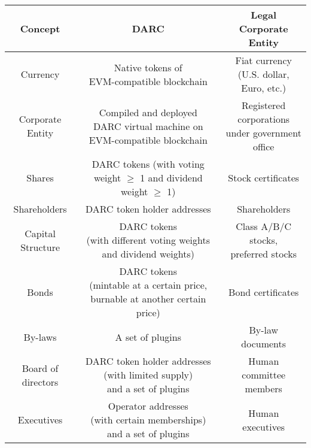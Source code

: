 \documentclass[main.tex]{subfiles}
\begin{document}
\begin{table}[h!]
    \centering
    \begin{tabular}{| c | c | c|} 
        \hline
        Concept & DARC & Legal Corporate Entity \\ [0.5ex] 
        \hline\hline
    
        Currency & \makecell{Native tokens of \\ EVM-compatible blockchain} & \makecell{Fiat currency \\ (U.S. dollar, Euro, etc.)} \\
        \hline
        Corporate Entity & \makecell{Compiled and deployed \\ DARC  virtual machine on \\  EVM-compatible blockchain} & \makecell{Registered corporations \\ under government office} \\
        \hline
        Shares & \makecell{DARC tokens \\ (with voting weight \(\ge\) 1 \\ and dividend weight \(\ge\) 1)} & Stock certificates \\
        \hline
        Shareholders & DARC token holder addresses & Shareholders \\
        \hline
        Capital Structure & \makecell{DARC tokens \\ (with different voting weights \\ and dividend weights)} & \makecell{Class A/B/C stocks, \\ preferred stocks } \\
        \hline
        Bonds & \makecell{DARC tokens \\ (mintable at a certain price, \\ burnable at another certain price)} & Bond certificates \\
        \hline
        By-laws & A set of plugins & By-law documents \\
        \hline 
        Board of directors & \makecell{DARC token holder addresses \\ (with limited supply) \\ and a set of plugins} & Human committee members  \\
        \hline
        Executives & \makecell{Operator addresses \\ (with certain memberships) \\ and a set of plugins} & Human executives \\

\end{tabular}
\end{table}
\end{document}
